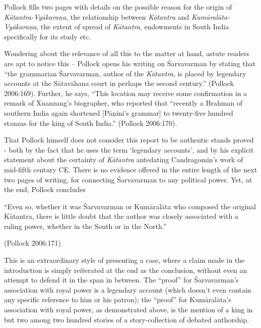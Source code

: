 \newpage

Pollock fills two pages with details on the possible reason for the origin of {\sl Kātantra-Vyākaraṇa}, the relationship between {\sl Kātantra} and {\sl Kumāralāta-Vyākaraṇa}, the extent of spread of {\sl Kātantra}, endowments in South India specifically for its study etc. 

Wondering about the relevance of all this to the matter at hand, astute readers are apt to notice this -- Pollock opens his writing on Śarvavarman by stating that ``the grammarian Śarvavarman, author of the {\sl Kātantra}, is placed by legendary accounts at the Sātavāhana court in perhaps the second century.'' (Pollock 2006:169). Further, he says, ``This location may receive some confirmation in a remark of Xuanzang's biographer, who reported that ``recently a Brahman of southern India again shortened [Pāṇini’s grammar] to twenty-five hundred stanzas for the king of South India.'' (Pollock 2006:170). 

That Pollock himself does not consider this report to be authentic stands proved - both by the fact that he uses the term `legendary accounts', and by his explicit statement about the certainty of {\sl Kātantra} antedating Candragomin's work of mid-fifth century CE. There is no evidence offered in the entire length of the next two pages of writing, for connecting Śarvavarman to any political power. Yet, at the end, Pollock concludes 

\begin{myquote}
``Even so, whether it was Śarvavarman or Kumāralāta who composed the original Kātantra, there is little doubt that the author was closely associated with a ruling power, whether in the South or in the North.''

\hfill (Pollock 2006:171) 
\end{myquote}
This is an extraordinary style  of presenting a case, where a claim made in the introduction is simply reiterated at the end as the conclusion, without even an attempt to defend it in the span in between. The ``proof'' for Śarvavarman’s association with royal power is a legendary account (which doesn't even contain any specific reference to him or his patron); the ``proof'' for Kumāralāta's association with royal power, as demonstrated above, is the mention of a king in but two among two hundred stories of a story-collection of debated authorship. 

